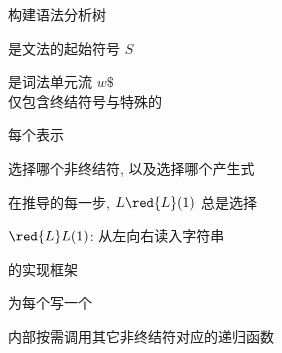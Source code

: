 \begin{frame}{}
  \begin{center}
    {\large {}构建语法分析树}

    \vspace{0.60cm}
    是文法的起始符号 $S$


    \vspace{0.80cm}
    是词法单元流 $w\$$ \\[8pt]
    仅包含终结符号与特殊的
  \end{center}
\end{frame}

\begin{frame}{}
  \begin{center}
    每个表示

    \vspace{0.50cm}
     选择哪个非终结符, 以及选择哪个产生式

    \pause
    \vspace{1.50cm}
    在推导的每一步, $L\red{L}(1)$ 总是选择

    \pause
    \vspace{1.60cm}
    $\red{L}L(1)$: 从左向右读入字符串
  \end{center}
\end{frame}

\begin{frame}{}
  \begin{center}
    {\large {}的实现框架}


    为每个写一个

    \vspace{0.20cm}
    内部按需调用其它非终结符对应的递归函数
  \end{center}
\end{frame}


